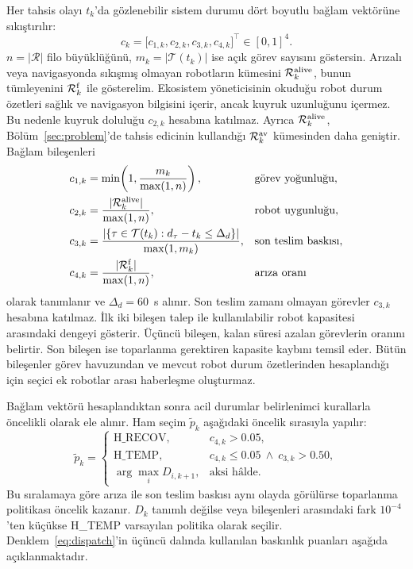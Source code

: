 \documentclass[10pt,letterpaper,onecolumn]{IEEEtran}
\begin{document}
Her tahsis olayı $t_k$'da gözlenebilir sistem durumu dört boyutlu bağlam
vektörüne sıkıştırılır:
\begin{equation}
  c_k=\big[c_{1,k},c_{2,k},c_{3,k},c_{4,k}\big]^\top\in[0,1]^4 .
  \label{eq:context-vector}
\end{equation}
$n=|\mathcal R|$ filo büyüklüğünü, $m_k=|\mathcal T(t_k)|$ ise açık görev
sayısını göstersin. Arızalı veya navigasyonda sıkışmış olmayan robotların
kümesini
$\mathcal R^{\rm alive}_k$, bunun tümleyenini $\mathcal R^{\rm f}_k$ ile
gösterelim. Ekosistem yöneticisinin okuduğu robot durum özetleri sağlık ve
navigasyon bilgisini içerir, ancak kuyruk uzunluğunu içermez. Bu nedenle kuyruk
doluluğu $c_{2,k}$ hesabına katılmaz. Ayrıca $\mathcal R^{\rm alive}_k$,
Bölüm~\ref{sec:problem}'de tahsis edicinin kullandığı
$\mathcal R^{\rm av}_k$ kümesinden daha geniştir. Bağlam bileşenleri
\begin{align}
 c_{1,k} &= \min\!\left(1,\frac{m_k}{\max(1,n)}\right),
 &&\text{görev yoğunluğu},\label{eq:ctx-start}\\
 c_{2,k} &= \frac{|\mathcal R^{\rm alive}_k|}{\max(1,n)},
 &&\text{robot uygunluğu},\\
 c_{3,k} &= \frac{\left|\left\{\tau\in\mathcal T(t_k):
                d_\tau-t_k\leq\Delta_d\right\}\right|}{\max(1,m_k)},
 &&\text{son teslim baskısı},\\
 c_{4,k} &= \frac{|\mathcal R^{\rm f}_k|}{\max(1,n)},
 &&\text{arıza oranı}\label{eq:ctx-end}
\end{align}
olarak tanımlanır ve $\Delta_d=60$~s alınır. Son teslim zamanı olmayan görevler
$c_{3,k}$ hesabına katılmaz. İlk iki bileşen talep ile kullanılabilir robot
kapasitesi arasındaki dengeyi gösterir. Üçüncü bileşen, kalan süresi azalan
görevlerin oranını belirtir. Son bileşen ise toparlanma gerektiren kapasite
kaybını temsil eder. Bütün bileşenler görev havuzundan ve mevcut robot durum
özetlerinden hesaplandığı için seçici ek robotlar arası haberleşme oluşturmaz.

\label{sec:dispatch}

Bağlam vektörü hesaplandıktan sonra acil durumlar belirlenimci kurallarla
öncelikli olarak ele alınır.
Ham seçim $\tilde p_k$ aşağıdaki öncelik sırasıyla yapılır:
\begin{equation}
\tilde p_k=
\begin{cases}
\mathrm{H\_RECOV}, & c_{4,k}>0.05,\\
\mathrm{H\_TEMP}, & c_{4,k}\leq0.05\ \wedge\ c_{3,k}>0.50,\\
\arg\max_i D_{i,k+1}, & \text{aksi hâlde}.
\end{cases}
\label{eq:dispatch}
\end{equation}
Bu sıralamaya göre arıza ile son teslim baskısı aynı olayda görülürse
toparlanma politikası öncelik kazanır. $D_k$ tanımlı değilse veya bileşenleri
arasındaki fark $10^{-4}$'ten küçükse H\_TEMP varsayılan politika olarak
seçilir. Denklem~\eqref{eq:dispatch}'in üçüncü dalında kullanılan baskınlık
puanları aşağıda açıklanmaktadır.
\end{document}
